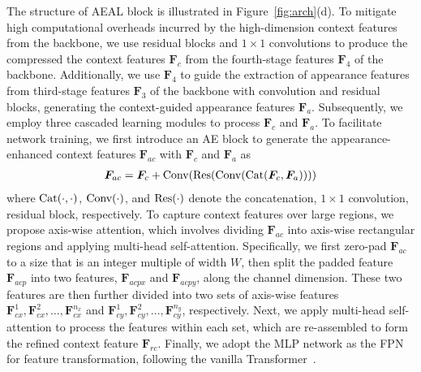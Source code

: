 \documentclass[10pt,twocolumn,letterpaper]{article}
\begin{document}
The structure of AEAL block is illustrated in Figure~\ref{fig:arch}(d).
To mitigate high computational overheads incurred by the high-dimension context features from the backbone, we use residual blocks and $1 \times 1$ convolutions to produce the compressed the context features $\bm{F}_c$ from the fourth-stage features $\bm{F}_4$ of the backbone.
Additionally, we use $\bm{F}_4$ to guide the extraction of appearance features from third-stage features $\bm{F}_3$ of the backbone with convolution and residual blocks, generating the context-guided appearance features $\bm{F}_a$. 
Subsequently, we employ three cascaded learning modules to process $\bm{F}_c$ and $\bm{F}_a$. 
To facilitate network training, we first introduce an AE block to generate the appearance-enhanced context features $\bm{F}_{ac}$ with $\bm{F}_c$ and $\bm{F}_a$ as 
\begin{equation}
\label{eq:alpha}
\begin{aligned}
\bm{F}_{ac} =\bm{F}_c + {\rm Conv(Res( Conv(Cat(}\bm{F}_c, \bm{F}_a))))
\end{aligned}
\end{equation}
where $\rm Cat(\cdot,\cdot)$, $\rm Conv(\cdot)$, and $\rm Res(\cdot)$ denote the concatenation, $1 \times 1$ convolution, residual block, respectively.
To capture context features over large regions, we propose axis-wise attention, which involves dividing $\bm{F}_{ac}$ into axis-wise rectangular regions and applying multi-head self-attention.
Specifically, we first zero-pad $\bm{F}_{ac}$ to a size that is an integer multiple of width $W$, then split the padded feature $\bm{F}_{acp}$ into two features, $\bm{F}_{acpx}$ and $\bm{F}_{acpy}$, along the channel dimension. 
These two features are then further divided into two sets of axis-wise features ${\bm{F}_{cx}^1, \bm{F}_{cx}^2, \dots, \bm{F}_{cx}^{n_x}}$ and ${\bm{F}_{cy}^1, \bm{F}_{cy}^2,\dots, \bm{F}_{cy}^{n_y}}$, respectively. 
Next, we apply multi-head self-attention to process the features within each set, which are re-assembled to form the refined context feature $\bm{F}_{rc}$.
Finally, we adopt the MLP network as the FPN for feature transformation, following the vanilla Transformer~\cite{vaswani2017attention}. 
 
\end{document}
